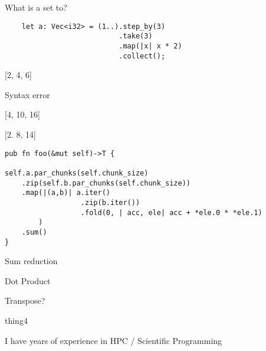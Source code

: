 \documentclass[11pt]{article} %
\newcommand*\choice{\item}
\begin{document}
\begin{multiplechoice}[choices=1]
  What is a set to?

  \begin{lstlisting}
    let a: Vec<i32> = (1..).step_by(3)
                           .take(3)
                           .map(|x| x * 2)
                           .collect();
  \end{lstlisting}

  \choice {[2, 4, 6]}
  \choice Syntax error
  \choice {[4, 10, 16]}
  \choice {[2. 8, 14]}
\end{multiplechoice}

\begin{multiplechoice}[choices=1]

\begin{lstlisting}
pub fn foo(&mut self)->T {

self.a.par_chunks(self.chunk_size)
    .zip(self.b.par_chunks(self.chunk_size))
    .map(|(a,b)| a.iter()
                  .zip(b.iter())
                  .fold(0, | acc, ele| acc + *ele.0 * *ele.1)
        )
    .sum()
}
\end{lstlisting}

\choice Sum reduction
\choice Dot Product
\choice Transpose?
\choice thing4

\end{multiplechoice}

\begin{exercise}
I have \blank{}  years of experience in HPC / Scientific Programming
\end{exercise}
\end{document}
